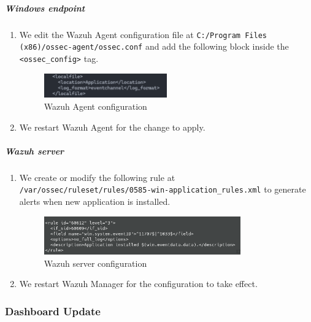 \subparagraph{Windows endpoint}
\begin{enumerate}
    \item We edit the Wazuh Agent configuration file at \texttt{C:/Program Files (x86)/ossec-agent/ossec.conf} and add the following block inside the \texttt{<ossec\_config>} tag.
    \begin{figure} [H]
    \centering
    \includegraphics[width=0.5\textwidth]{images/log-data/9.png}
    \caption{Wazuh Agent configuration}
    \end{figure}
    \item We restart Wazuh Agent for the change to apply.
\end{enumerate}

\subparagraph{Wazuh server}
\begin{enumerate}
    \item We create or modify the following rule at \\ \texttt{/var/ossec/ruleset/rules/0585-win-application\_rules.xml} to generate alerts when new application is installed.
    \begin{figure} [H]
    \centering
    \includegraphics[width=0.8\textwidth]{images/log-data/10.png}
    \caption{Wazuh server configuration}
    \end{figure}
    \item We restart Wazuh Manager for the configuration to take effect.
\end{enumerate}

\subsubsection{Dashboard Update}

